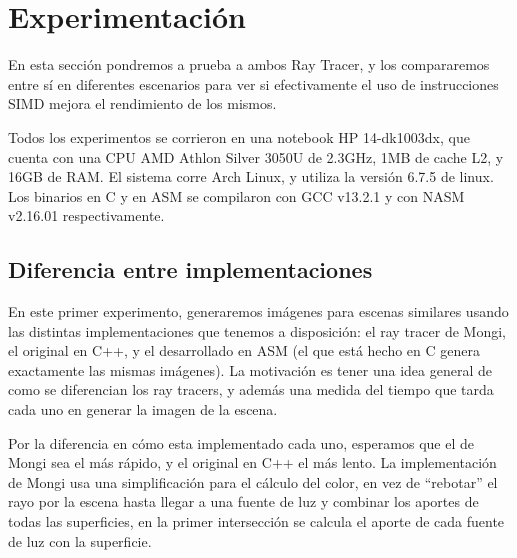 
\section{Experimentación}

En esta sección pondremos a prueba a ambos Ray Tracer, y los compararemos entre
sí en diferentes escenarios para ver si efectivamente el uso de instrucciones
SIMD mejora el rendimiento de los mismos.

Todos los experimentos se corrieron en una notebook HP 14-dk1003dx, que cuenta
con una CPU AMD Athlon Silver 3050U de 2.3GHz, 1MB de cache L2, y 16GB de RAM.
El sistema corre Arch Linux, y utiliza la versión 6.7.5 de linux. Los binarios
en C y en ASM se compilaron con GCC v13.2.1 y con NASM v2.16.01 respectivamente.

\subsection{Diferencia entre implementaciones}

En este primer experimento, generaremos imágenes para escenas similares usando
las distintas implementaciones que tenemos a disposición: el ray tracer de
Mongi, el original en C++, y el desarrollado en ASM (el que está hecho en C
genera exactamente las mismas imágenes). La motivación es tener una idea general
de como se diferencian los ray tracers, y además una medida del tiempo que tarda
cada uno en generar la imagen de la escena.

Por la diferencia en cómo esta implementado cada uno, esperamos que el de Mongi
sea el más rápido, y el original en C++ el más lento. La implementación de Mongi
usa una simplificación para el cálculo del color, en vez de ``rebotar'' el rayo
por la escena hasta llegar a una fuente de luz y combinar los aportes de todas
las superficies, en la primer intersección se calcula el aporte de cada fuente
de luz con la superficie.

